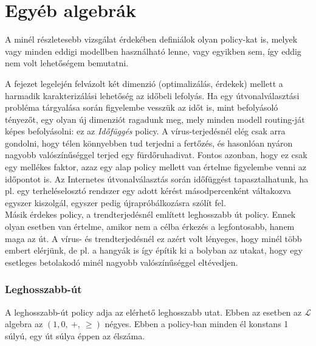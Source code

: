   \section{Egyéb algebrák}

  A minél részletesebb vizsgálat érdekében definiálok olyan policy-kat is, melyek vagy minden eddigi modellben használható lenne, vagy egyikben sem, így eddig nem volt lehetőségem bemutatni.

  A fejezet legelején felvázolt két dimenzió (optimalizálás, érdekek) mellett a harmadik karakterizálási lehetőség az időbeli lefolyás. Ha egy útvonalválasztási probléma tárgyalása során figyelembe vesszük az időt is, mint befolyásoló tényezőt, egy olyan új dimenziót ragadunk meg, mely minden modell routing-ját képes befolyásolni: ez az \emph{Időfüggés} policy. A vírus-terjedésnél elég csak arra gondolni, hogy télen könnyebben tud terjedni a fertőzés, és hasonlóan nyáron nagyobb valószínűséggel terjed egy fürdőruhadivat. Fontos azonban, hogy ez csak egy mellékes faktor, azaz egy alap policy mellett van értelme figyelembe venni az időpontot is. Az Internetes útvonalválasztás során időfüggést tapasztalhatunk, ha pl. egy terheléselosztó rendszer egy adott kérést másodpercenként váltakozva egyszer kiszolgál, egyszer pedig újrapróbálkozásra szólít fel.\\

  Másik érdekes policy, a trendterjedésnél említett leghosszabb út policy. Ennek olyan esetben van értelme, amikor nem a célba érkezés a legfontosabb, hanem maga az út. A vírus- és trendterjedésnél ez azért volt lényeges, hogy minél több embert elérjünk, de pl. a hangyák is így építik ki a bolyban az utakat, hogy egy esetleges betolakodó minél nagyobb valószínűséggel eltévedjen.

      \subsubsection{Leghosszabb-út}

      A leghosszabb-út policy adja az elérhető leghosszabb utat. Ebben az esetben az $\mathcal{L}$ algebra az $(1, 0,~+,~\geq)$ négyes. Ebben a policy-ban minden él konstans 1 súlyú, egy út súlya éppen az élszáma.

